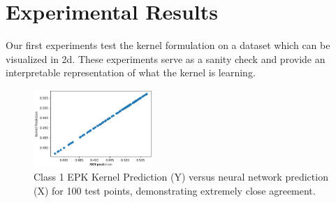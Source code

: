 \section{Experimental Results}
    Our first experiments test the kernel formulation on a dataset 
    which can be visualized in 2d. These experiments serve as a sanity check
    and provide an interpretable representation of what the kernel is learning.
    \begin{figure}[!ht]
        \centering

        \includegraphics[width=0.40\textwidth]{c4_figures/image.png}
        \caption{Class 1 EPK Kernel Prediction (Y) versus neural network prediction (X) for 100 test points, demonstrating extremely close agreement.}
        \label{fig:toymatch}
    \end{figure}

